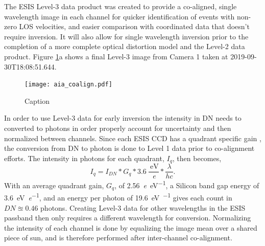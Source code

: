 {    
    	\newcommand{\vigfit}{[0.44, 0.34, 0.38, 0.5]}
    	\newcommand{\levthreetime}{2019-09-30T18:08:51.644}
    	
    	
    	The ESIS Level-3 data product was created to provide a co-aligned, single wavelength image in each channel for quicker identification of events with non-zero LOS velocities, and easier comparison with coordinated data that doesn't require inversion. 
    	It will also allow for single wavelength inversion prior to the completion of a more complete optical distortion model and the Level-2 data product.
    	Figure \ref{fig:coalign}a shows a final Level-3 image from Camera 1 taken at \levthreetime.
    	
  		\begin{figure}[htb!]
    		\centering
    		\texttt{[image: aia\_coalign.pdf]}
    		\caption{Caption}
    		\label{fig:coalign}
    	\end{figure}
    	
    
     	In order to use Level-3 data for early inversion the intensity in DN needs to  converted to photons in order properly account for uncertainty and then normalized between channels.
   		Since each ESIS CCD has a quadrant specific gain \citep{ESIS}, the conversion from DN to photon is done to Level 1 data prior to co-alignment efforts.
   		The intensity in photons for each quadrant, $I_q$, then becomes,
   		\begin{equation}
	   		I_q = I_{DN} * G_q * 3.6\ \frac{\SI{}{\electronvolt}}{\SI{}{\elementarycharge}} * \frac{\lambda}{hc}.
   		\end{equation}
		With an average quadrant gain, $G_q$, of \SI[per-mode=symbol]{2.56}{\elementarycharge\per\electronvolt}, a Silicon band gap energy of \SI[per-mode=symbol]{3.6}{\electronvolt\per\elementarycharge}, and an energy per \ov photon of \SI[per-mode=symbol]{19.6}{\electronvolt\per\photon} gives each count in $DN \approxeq 0.46$ photons.
		Creating Level-3 data for other wavelengths in the ESIS passband then only requires a different wavelength for conversion.
   		Normalizing the intensity of each channel is done by equalizing the image mean over a shared piece of sun, and is therefore performed after inter-channel co-alignment.
   		
}
